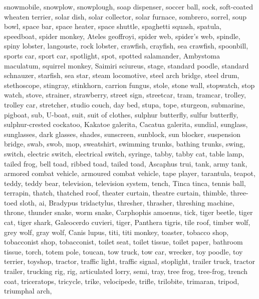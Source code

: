 \documentclass{article}
\begin{document}
{{snowmobile},
{snowplow, snowplough},
{soap dispenser},
{soccer ball},
{sock},
{soft-coated wheaten terrier},
{solar dish, solar collector, solar furnace},
{sombrero},
{sorrel},
{soup bowl},
{space bar},
{space heater},
{space shuttle},
{spaghetti squash},
{spatula},
{speedboat},
{spider monkey, Ateles geoffroyi},
{spider web, spider's web},
{spindle},
{spiny lobster, langouste, rock lobster, crawfish, crayfish, sea crawfish},
{spoonbill},
{sports car, sport car},
{spotlight, spot},
{spotted salamander, Ambystoma maculatum},
{squirrel monkey, Saimiri sciureus},
{stage},
{standard poodle},
{standard schnauzer},
{starfish, sea star},
{steam locomotive},
{steel arch bridge},
{steel drum},
{stethoscope},
{stingray},
{stinkhorn, carrion fungus},
{stole},
{stone wall},
{stopwatch, stop watch},
{stove},
{strainer},
{strawberry},
{street sign},
{streetcar, tram, tramcar, trolley, trolley car},
{stretcher},
{studio couch, day bed},
{stupa, tope},
{sturgeon},
{submarine, pigboat, sub, U-boat},
{suit, suit of clothes},
{sulphur butterfly, sulfur butterfly},
{sulphur-crested cockatoo, Kakatoe galerita, Cacatua galerita},
{sundial},
{sunglass},
{sunglasses, dark glasses, shades},
{sunscreen, sunblock, sun blocker},
{suspension bridge},
{swab, swob, mop},
{sweatshirt},
{swimming trunks, bathing trunks},
{swing},
{switch, electric switch, electrical switch},
{syringe},
{tabby, tabby cat},
{table lamp},
{tailed frog, bell toad, ribbed toad, tailed toad, Ascaphus trui},
{tank, army tank, armored combat vehicle, armoured combat vehicle},
{tape player},
{tarantula},
{teapot},
{teddy, teddy bear},
{television, television system},
{tench, Tinca tinca},
{tennis ball},
{terrapin},
{thatch, thatched roof},
{theater curtain, theatre curtain},
{thimble},
{three-toed sloth, ai, Bradypus tridactylus},
{thresher, thrasher, threshing machine},
{throne},
{thunder snake, worm snake, Carphophis amoenus},
{tick},
{tiger beetle},
{tiger cat},
{tiger shark, Galeocerdo cuvieri},
{tiger, Panthera tigris},
{tile roof},
{timber wolf, grey wolf, gray wolf, Canis lupus},
{titi, titi monkey},
{toaster},
{tobacco shop, tobacconist shop, tobacconist},
{toilet seat},
{toilet tissue, toilet paper, bathroom tissue},
{torch},
{totem pole},
{toucan},
{tow truck, tow car, wrecker},
{toy poodle},
{toy terrier},
{toyshop},
{tractor},
{traffic light, traffic signal, stoplight},
{trailer truck, tractor trailer, trucking rig, rig, articulated lorry, semi},
{tray},
{tree frog, tree-frog},
{trench coat},
{triceratops},
{tricycle, trike, velocipede},
{trifle},
{trilobite},
{trimaran},
{tripod},
{triumphal arch},
}
\end{document}
